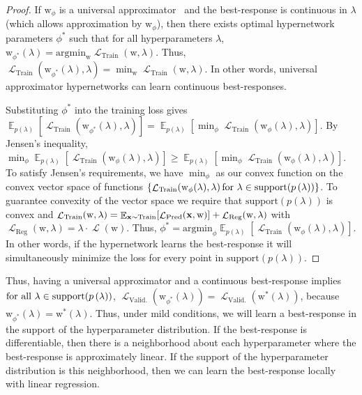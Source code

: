 \documentclass{article} %
\newcommand{\prior}[1]{p \left( #1 \right)} %
\newcommand{\param}{\mathrm{w}} %
\newcommand{\hyper}{\lambda} %
\newcommand{\hyperDist}{\prior{\hyper}} %
\newcommand{\hyperHyper}{\hyper'} %
\newcommand{\innerOptParam}[1]{\param^{*} \! \left( #1 \right)} %
\newcommand{\lossSymbol}{\mathop{\mathcal{L}}} %
\newcommand{\lossSymbolInner}{\lossSymbol_{\mathrm{Train}}} %
\newcommand{\lossSymbolOuter}{\lossSymbol_{\mathrm{Valid.}}} %
\newcommand{\innerLoss}[2]{\lossSymbolInner \! \left( #1, #2 \right)} %
\newcommand{\outerLoss}[1]{\lossSymbolOuter \! \left( #1 \right)}%
\newcommand{\predictionLoss}[2]{\lossSymbol_{\mathrm{Pred}} ( #1, #2 )} %
\newcommand{\regLoss}[2]{\lossSymbol_{\mathrm{Reg}} ( #1, #2 )}%
\newcommand{\variableData}{\bf{x}} %
\newcommand{\ETrain}[1]{\mathop{\mathbb{E}}_{\variableData \sim \mathrm{Train}} \! \left[ #1 \right]}
\newcommand{\innerLossEExpand}[2]{\ETrain{\predictionLoss{\variableData}{#1}} + \regLoss{#1}{#2}} %
\newcommand{\responseParam}{\phi} %
\newcommand{\approxResponseSymbol}[1]{\param_{#1}} %
\newcommand{\approxResponse}[2]{\approxResponseSymbol{#2} ( #1 )} %
\newcommand{\argminTargetFix}{\responseParam}%
\newcommand{\approxResponseOutput}[1]{\approxResponseSymbol{\responseParam^{*}} ( #1 )}
\newcommand{\proofLoss}{\innerLoss{\approxResponse{\hyper}{\responseParam}}{\hyper}}
\newcommand{\proofTargetLossOutput}{\outerLoss{\approxResponseOutput{\hyper}}}
\newcommand{\targetLoss}{\outerLoss{\innerOptParam{\hyper}}}
\newcommand{\phyper}{p \left( \hyper \right)}
\newcommand{\hyperSupport}{\mathrm{support} \! \left( \phyper \right)} %
\newcommand{\hyperDomain}{\textnormal{for all } \hyper \in \hyperSupport}
\newcommand{\Ehyper}[1]{\mathop{\mathbb{E}}_{\phyper} \! \left[ #1 \right]}
\begin{document}
\begin{proof}
If $\param_{\responseParam}$ is a universal approximator~\citep{hornik1991approximation} and the best-response is continuous in $\hyper$ (which allows approximation by $\param_{\responseParam}$), then there exists optimal hypernetwork parameters $\responseParam^{*}$ such that for all hyperparameters $\hyper$, $\param_{\responseParam^{*}} (\hyper) = \mathrm{argmin}_{\param} \innerLoss{\param}{\hyper}$.
Thus, $\innerLoss{\param_{\responseParam^{*}} \left( \hyper \right)}{\hyper} = \min_{\param} \innerLoss{\param}{\hyper}$.
In other words, universal approximator hypernetworks can learn continuous best-responses.

Substituting $\responseParam^{*}$ into the training loss gives ${\Ehyper{\innerLoss{\approxResponse{\hyper}{\responseParam^{*}}}{\hyper}} = \Ehyper{\min_{\argminTargetFix} \proofLoss}}$.
By Jensen's inequality, $\min_{\argminTargetFix} \Ehyper{\proofLoss} \geq \Ehyper{\min_{\argminTargetFix} \proofLoss}$.
To satisfy Jensen's requirements, we have $\min_{\argminTargetFix}$ as our convex function on the convex vector space of functions $\{\proofLoss \textnormal{for } \hyper \in \hyperSupport \}$.
To guarantee convexity of the vector space we require that $\hyperSupport$ is convex and $\innerLoss{\param}{\hyper} = \innerLossEExpand{\param}{\hyper}$ with $\regLoss{\param}{\hyper} = \hyper \cdot \lossSymbol ( \param)$.
Thus, $\responseParam^{*} = \mathrm{argmin}_{\argminTargetFix} \Ehyper{\proofLoss}$.
In other words, if the hypernetwork learns the best-response it will simultaneously minimize the loss for every point in $\hyperSupport$.
\end{proof}
%
Thus, having a universal approximator and a continuous best-response implies $\hyperDomain$, $\proofTargetLossOutput = \targetLoss$, because $\approxResponseOutput{\hyper} = \innerOptParam{\hyper}$.
Thus, under mild conditions, we will learn a best-response in the support of the hyperparameter distribution.
If the best-response is differentiable, then there is a neighborhood about each hyperparameter where the best-response is approximately linear.
If the support of the hyperparameter distribution is this neighborhood, then we can learn the best-response locally with linear regression.
\end{document}
